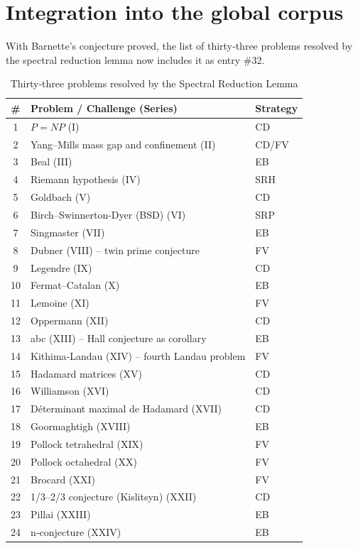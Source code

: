 \documentclass[11pt,a4paper]{article}
\begin{document}
\section{Integration into the global corpus}

With Barnette's conjecture proved, the list of thirty‑three problems resolved by the spectral reduction lemma now includes it as entry \#32.

\begin{center}
\small
\begin{longtable}{@{}cll@{}}
\caption{Thirty‑three problems resolved by the Spectral Reduction Lemma}\\
\toprule
\# & Problem / Challenge (Series) & Strategy \\
\midrule
1 & \(P = NP\) (I) & CD \\
2 & Yang–Mills mass gap and confinement (II) & CD/FV \\
3 & Beal (III) & EB \\
4 & Riemann hypothesis (IV) & SRH \\
5 & Goldbach (V) & CD \\
6 & Birch–Swinnerton-Dyer (BSD) (VI) & SRP \\
7 & Singmaster (VII) & EB \\
8 & Dubner (VIII) – twin prime conjecture & FV \\
9 & Legendre (IX) & CD \\
10 & Fermat–Catalan (X) & EB \\
11 & Lemoine (XI) & FV \\
12 & Oppermann (XII) & CD \\
13 & abc (XIII) – Hall conjecture as corollary & EB \\
14 & Kithima‑Landau (XIV) – fourth Landau problem & FV \\
15 & Hadamard matrices (XV) & CD \\
16 & Williamson (XVI) & CD \\
17 & Déterminant maximal de Hadamard (XVII) & CD \\
18 & Goormaghtigh (XVIII) & EB \\
19 & Pollock tetrahedral (XIX) & FV \\
20 & Pollock octahedral (XX) & FV \\
21 & Brocard (XXI) & FV \\
22 & 1/3–2/3 conjecture (Kislitsyn) (XXII) & CD \\
23 & Pillai (XXIII) & EB \\
24 & n‑conjecture (XXIV) & EB \\

\end{longtable}
\end{center}
\end{document}

